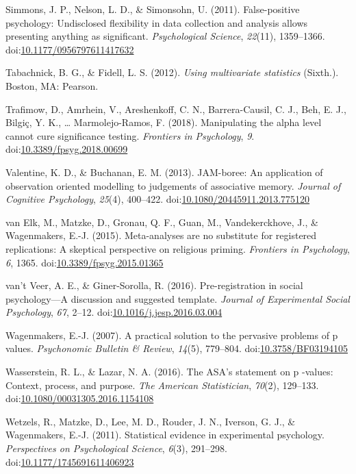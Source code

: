\documentclass[,man, mask]{apa6}
\begin{document}
\leavevmode\hypertarget{ref-Simmons2011}{}%
Simmons, J. P., Nelson, L. D., \& Simonsohn, U. (2011). False-positive psychology: Undisclosed flexibility in data collection and analysis allows presenting anything as significant. \emph{Psychological Science}, \emph{22}(11), 1359--1366. doi:\href{https://doi.org/10.1177/0956797611417632}{10.1177/0956797611417632}

\leavevmode\hypertarget{ref-Tabachnick2012}{}%
Tabachnick, B. G., \& Fidell, L. S. (2012). \emph{Using multivariate statistics} (Sixth.). Boston, MA: Pearson.

\leavevmode\hypertarget{ref-Trafimow2018}{}%
Trafimow, D., Amrhein, V., Areshenkoff, C. N., Barrera-Causil, C. J., Beh, E. J., Bilgiç, Y. K., \ldots{} Marmolejo-Ramos, F. (2018). Manipulating the alpha level cannot cure significance testing. \emph{Frontiers in Psychology}, \emph{9}. doi:\href{https://doi.org/10.3389/fpsyg.2018.00699}{10.3389/fpsyg.2018.00699}

\leavevmode\hypertarget{ref-Valentine2013}{}%
Valentine, K. D., \& Buchanan, E. M. (2013). JAM-boree: An application of observation oriented modelling to judgements of associative memory. \emph{Journal of Cognitive Psychology}, \emph{25}(4), 400--422. doi:\href{https://doi.org/10.1080/20445911.2013.775120}{10.1080/20445911.2013.775120}

\leavevmode\hypertarget{ref-VanElk2015}{}%
van Elk, M., Matzke, D., Gronau, Q. F., Guan, M., Vandekerckhove, J., \& Wagenmakers, E.-J. (2015). Meta-analyses are no substitute for registered replications: A skeptical perspective on religious priming. \emph{Frontiers in Psychology}, \emph{6}, 1365. doi:\href{https://doi.org/10.3389/fpsyg.2015.01365}{10.3389/fpsyg.2015.01365}

\leavevmode\hypertarget{ref-VantVeer2016}{}%
van't Veer, A. E., \& Giner-Sorolla, R. (2016). Pre-registration in social psychology---A discussion and suggested template. \emph{Journal of Experimental Social Psychology}, \emph{67}, 2--12. doi:\href{https://doi.org/10.1016/j.jesp.2016.03.004}{10.1016/j.jesp.2016.03.004}

\leavevmode\hypertarget{ref-Wagenmakers2007}{}%
Wagenmakers, E.-J. (2007). A practical solution to the pervasive problems of p values. \emph{Psychonomic Bulletin \& Review}, \emph{14}(5), 779--804. doi:\href{https://doi.org/10.3758/BF03194105}{10.3758/BF03194105}

\leavevmode\hypertarget{ref-Wasserstein2016}{}%
Wasserstein, R. L., \& Lazar, N. A. (2016). The ASA's statement on p -values: Context, process, and purpose. \emph{The American Statistician}, \emph{70}(2), 129--133. doi:\href{https://doi.org/10.1080/00031305.2016.1154108}{10.1080/00031305.2016.1154108}

\leavevmode\hypertarget{ref-Wetzels2011}{}%
Wetzels, R., Matzke, D., Lee, M. D., Rouder, J. N., Iverson, G. J., \& Wagenmakers, E.-J. (2011). Statistical evidence in experimental psychology. \emph{Perspectives on Psychological Science}, \emph{6}(3), 291--298. doi:\href{https://doi.org/10.1177/1745691611406923}{10.1177/1745691611406923}
\end{document}
